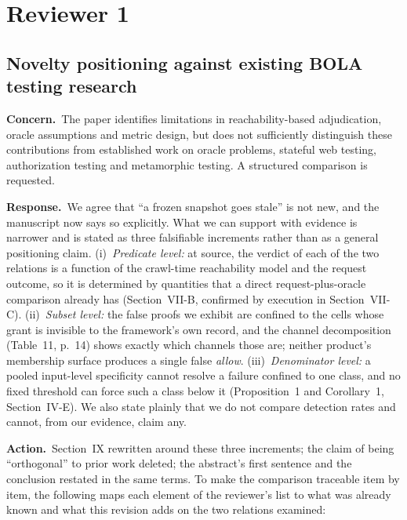 \documentclass[10pt,letterpaper]{article}
\newcommand{\Concern}[1]{\par\smallskip\noindent\textbf{Concern.}\ #1\par}
\newcommand{\Response}[1]{\par\smallskip\noindent\textbf{Response.}\ #1\par}
\newcommand{\Action}[1]{\par\smallskip\noindent\textbf{Action.}\ #1\par}
\begin{document}
\section{Reviewer 1}

\subsection{Novelty positioning against existing BOLA testing research}
\Concern{The paper identifies limitations in reachability-based adjudication,
oracle assumptions and metric design, but does not sufficiently distinguish these
contributions from established work on oracle problems, stateful web testing,
authorization testing and metamorphic testing. A structured comparison is
requested.}
\Response{We agree that ``a frozen snapshot goes stale'' is not new, and the
manuscript now says so explicitly. What we can support with evidence is narrower
and is stated as three falsifiable increments rather than as a general
positioning claim. (i)~\emph{Predicate level:} at source, the verdict of each of
the two relations is a function of the crawl-time reachability model and the
request outcome, so it is determined by quantities that a direct
request-plus-oracle comparison already has (Section~VII-B, confirmed by
execution in Section~VII-C). (ii)~\emph{Subset level:} the false proofs we
exhibit are confined to the cells whose grant is invisible to the framework's own
record, and the channel decomposition (Table~11, p.~14) shows exactly which
channels those are; neither product's membership surface produces a single false
\emph{allow}. (iii)~\emph{Denominator level:} a pooled input-level specificity
cannot resolve a failure confined to one class, and no fixed threshold can force
such a class below it (Proposition~1 and Corollary~1, Section~IV-E). We also
state plainly that we do not compare detection rates and cannot, from our
evidence, claim any.}
\Action{Section~IX rewritten around these three increments; the claim of being
``orthogonal'' to prior work deleted; the abstract's first sentence and the
conclusion restated in the same terms. To make the comparison traceable item by
item, the following maps each element of the reviewer's list to what was already
known and what this revision adds on the two relations examined:}
\end{document}
